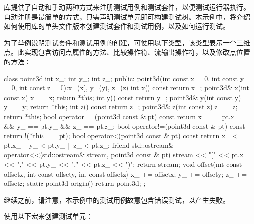 
库提供了自动和手动两种方式来注册测试用例和测试套件，以便测试运行器执行。自动注册是最简单的方式，只需声明测试单元即可构建测试树。本示例中，将介绍如何使用库的单头文件版本创建测试套件和测试用例，以及如何运行测试。


为了举例说明测试套件和测试用例的创建，可使用以下类型，该类型表示一个三维点。此实现包含访问点属性的方法、比较操作符、流输出操作符，以及修改点位置的方法：

\begin{cpp}
class point3d
{
    int x_;
    int y_;
    int z_;
    public:
    point3d(int const x = 0,
            int const y = 0,
            int const z = 0):x_(x), y_(y), z_(z) {}
    int x() const { return x_; }
    point3d& x(int const x) { x_ = x; return *this; }
    int y() const { return y_; }
    point3d& y(int const y) { y_ = y; return *this; }
    int z() const { return z_; }
    point3d& z(int const z) { z_ = z; return *this; }
    bool operator==(point3d const & pt) const
    {
        return x_ == pt.x_ && y_ == pt.y_ && z_ == pt.z_;
    }
    bool operator!=(point3d const & pt) const
    {
        return !(*this == pt);
    }
    bool operator<(point3d const & pt) const
    {
        return x_ < pt.x_ || y_ < pt.y_ || z_ < pt.z_;
    }
    friend std::ostream& operator<<(std::ostream& stream,
    point3d const & pt)
    {
        stream << "(" << pt.x_ << "," << pt.y_ << "," << pt.z_ << ")";
        return stream;
    }
    void offset(int const offsetx, int const offsety, int const offsetz)
    {
        x_ += offsetx;
        y_ += offsety;
        z_ += offsetz;
    }
    static point3d origin() { return point3d{}; }
};
\end{cpp}

继续之前，请注意，本示例中的测试用例故意包含错误测试，以产生失败。


使用以下宏来创建测试单元：


